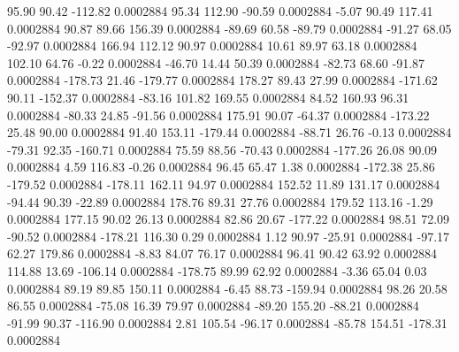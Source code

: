        95.90       90.42     -112.82     0.0002884
       95.34      112.90      -90.59     0.0002884
       -5.07       90.49      117.41     0.0002884
       90.87       89.66      156.39     0.0002884
      -89.69       60.58      -89.79     0.0002884
      -91.27       68.05      -92.97     0.0002884
      166.94      112.12       90.97     0.0002884
       10.61       89.97       63.18     0.0002884
      102.10       64.76       -0.22     0.0002884
      -46.70       14.44       50.39     0.0002884
      -82.73       68.60      -91.87     0.0002884
     -178.73       21.46     -179.77     0.0002884
      178.27       89.43       27.99     0.0002884
     -171.62       90.11     -152.37     0.0002884
      -83.16      101.82      169.55     0.0002884
       84.52      160.93       96.31     0.0002884
      -80.33       24.85      -91.56     0.0002884
      175.91       90.07      -64.37     0.0002884
     -173.22       25.48       90.00     0.0002884
       91.40      153.11     -179.44     0.0002884
      -88.71       26.76       -0.13     0.0002884
      -79.31       92.35     -160.71     0.0002884
       75.59       88.56      -70.43     0.0002884
     -177.26       26.08       90.09     0.0002884
        4.59      116.83       -0.26     0.0002884
       96.45       65.47        1.38     0.0002884
     -172.38       25.86     -179.52     0.0002884
     -178.11      162.11       94.97     0.0002884
      152.52       11.89      131.17     0.0002884
      -94.44       90.39      -22.89     0.0002884
      178.76       89.31       27.76     0.0002884
      179.52      113.16       -1.29     0.0002884
      177.15       90.02       26.13     0.0002884
       82.86       20.67     -177.22     0.0002884
       98.51       72.09      -90.52     0.0002884
     -178.21      116.30        0.29     0.0002884
        1.12       90.97      -25.91     0.0002884
      -97.17       62.27      179.86     0.0002884
       -8.83       84.07       76.17     0.0002884
       96.41       90.42       63.92     0.0002884
      114.88       13.69     -106.14     0.0002884
     -178.75       89.99       62.92     0.0002884
       -3.36       65.04        0.03     0.0002884
       89.19       89.85      150.11     0.0002884
       -6.45       88.73     -159.94     0.0002884
       98.26       20.58       86.55     0.0002884
      -75.08       16.39       79.97     0.0002884
      -89.20      155.20      -88.21     0.0002884
      -91.99       90.37     -116.90     0.0002884
        2.81      105.54      -96.17     0.0002884
      -85.78      154.51     -178.31     0.0002884
